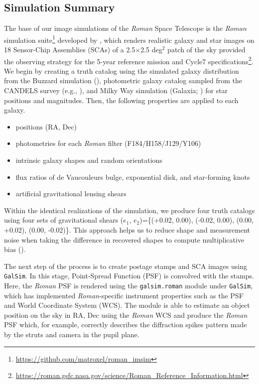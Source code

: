 {\subsection{Simulation Summary}
\label{subsec:imsim}
The base of our image simulations of the \emph{Roman} Space Telescope is the \emph{Roman} simulation suite\footnote{\url{ https://github.com/matroxel/roman_imsim}} developed by \citet{2021MNRAS.501.2044T}, which renders realistic galaxy and star images on 18 Sensor-Chip Assemblies (SCAs) of a 2.5$\times$2.5 deg$^{2}$ patch of the sky provided the observing strategy for the 5-year reference mission and Cycle7 specifications\footnote{\url{https://roman.gsfc.nasa.gov/science/Roman_Reference_Information.html}}. We begin by creating a truth catalog using the simulated galaxy distribution from the Buzzard simulation (\citealt{2019arXiv190102401D}), photometric galaxy catalog sampled from the CANDELS survey (e.g., \citealt{2019ApJ...877..117H}), and Milky Way simulation (Galaxia; \citealt{2011ApJ...730....3S}) for star positions and magnitudes. Then, the following properties are applied to each galaxy.
\begin{itemize}
    \item positions (RA, Dec)
    \item photometries for each \emph{Roman} filter (F184/H158/J129/Y106)
    \item intrinsic galaxy shapes and random orientations
    \item flux ratios of de Vaucouleurs bulge, exponential disk, and star-forming knots
    \item artificial gravitational lensing shears
\end{itemize} 
Within the identical realizations of the simulation, we produce four truth catalogs using four sets of gravitational shears ($e_{1}$, $e_{2}$)=\{(+0.02, 0.00), (-0.02, 0.00), (0.00, +0.02), (0.00, -0.02)\}. This approach helps us to reduce shape and measurement noise when taking the difference in recovered shapes to compute multiplicative bias (\citealt{2019A&A...621A...2P}). 


The next step of the process is to create postage stamps and SCA images using \texttt{GalSim}. In this stage, Point-Spread Function (PSF) is convolved with the stamps. Here, the \emph{Roman} PSF is rendered using the \texttt{galsim.roman} module under \texttt{GalSim}, which has implemented \emph{Roman}-specific instrument properties such as the PSF and World Coordinate System (WCS). The module is able to estimate an object position on the sky in RA, Dec using the \emph{Roman} WCS and produce the \emph{Roman} PSF which, for example, correctly describes the diffraction spikes pattern made by the struts and camera in the pupil plane. 



}
